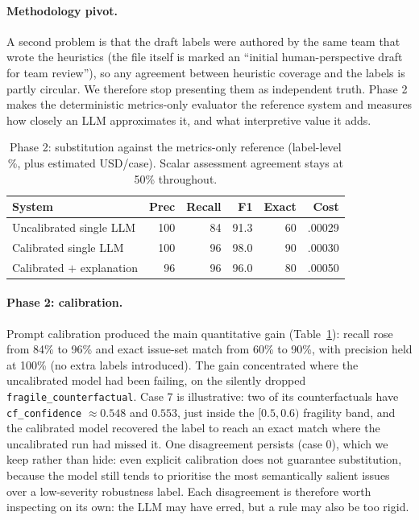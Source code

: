 \documentclass[letterpaper]{article}
\begin{document}
\paragraph{Methodology pivot.}
A second problem is that the draft labels were authored by the same team that wrote the heuristics (the file itself is marked an ``initial human-perspective draft for team review''), so any agreement between heuristic coverage and the labels is partly circular. We therefore stop presenting them as independent truth. Phase 2 makes the deterministic metrics-only evaluator the reference system and measures how closely an LLM approximates it, and what interpretive value it adds.

\begin{table}[t]
\centering
\scriptsize
\setlength{\tabcolsep}{4pt}
\caption{Phase 2: substitution against the metrics-only reference (label-level \%, plus estimated USD/case). Scalar assessment agreement stays at 50\% throughout.}
\label{tab:phase2}
\begin{tabular}{@{}lrrrrr@{}}
\toprule
System & Prec & Recall & F1 & Exact & Cost \\
\midrule
Uncalibrated single LLM & 100 & 84 & 91.3 & 60 & .00029 \\
Calibrated single LLM & 100 & 96 & 98.0 & 90 & .00030 \\
Calibrated $+$ explanation & 96 & 96 & 96.0 & 80 & .00050 \\
\bottomrule
\end{tabular}
\end{table}

\paragraph{Phase 2: calibration.}
Prompt calibration produced the main quantitative gain (Table~\ref{tab:phase2}): recall rose from 84\% to 96\% and exact issue-set match from 60\% to 90\%, with precision held at 100\% (no extra labels introduced). The gain concentrated where the uncalibrated model had been failing, on the silently dropped \texttt{fragile\_counterfactual}. Case 7 is illustrative: two of its counterfactuals have \texttt{cf\_confidence} $\approx 0.548$ and $0.553$, just inside the $[0.5,0.6)$ fragility band, and the calibrated model recovered the label to reach an exact match where the uncalibrated run had missed it. One disagreement persists (case 0), which we keep rather than hide: even explicit calibration does not guarantee substitution, because the model still tends to prioritise the most semantically salient issues over a low-severity robustness label. Each disagreement is therefore worth inspecting on its own: the LLM may have erred, but a rule may also be too rigid.
\end{document}

